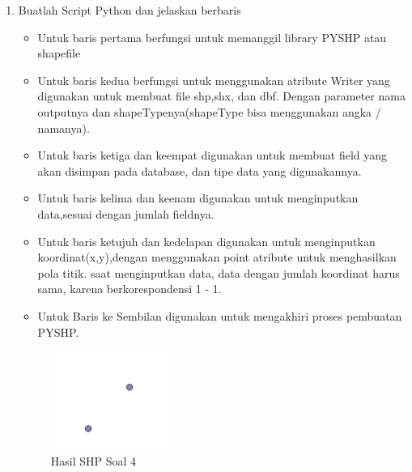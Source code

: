 \begin{enumerate}
	\item Buatlah Script Python dan jelaskan berbaris
	
	\begin{itemize}
		\item Untuk baris pertama berfungsi untuk memanggil library PYSHP atau shapefile
		\item Untuk baris kedua berfungsi untuk menggunakan atribute Writer yang digunakan untuk membuat file shp,shx, dan dbf. \hfill\break Dengan parameter nama outputnya dan shapeTypenya(shapeType bisa menggunakan angka / namanya).
		\item Untuk baris ketiga dan keempat digunakan untuk membuat field yang akan disimpan pada database, dan tipe data yang digunakannya.
		\item Untuk baris kelima dan keenam digunakan untuk menginputkan data,sesuai dengan jumlah fieldnya.
		\item Untuk baris ketujuh dan kedelapan digunakan untuk menginputkan koordinat(x,y),dengan menggunakan point atribute untuk menghasilkan pola titik. \hfill\break
		saat menginputkan data, data dengan jumlah koordinat harus sama, karena berkorespondensi 1 - 1.
		\item Untuk Baris ke Sembilan digunakan untuk mengakhiri proses pembuatan PYSHP.
	\end{itemize}
	\hfill\break
	\begin{figure}[H]
		\includegraphics[width=4cm]{figures/1174004/2/4.png}
		\centering
		\caption{Hasil SHP Soal 4}
	\end{figure}


\end{enumerate}

